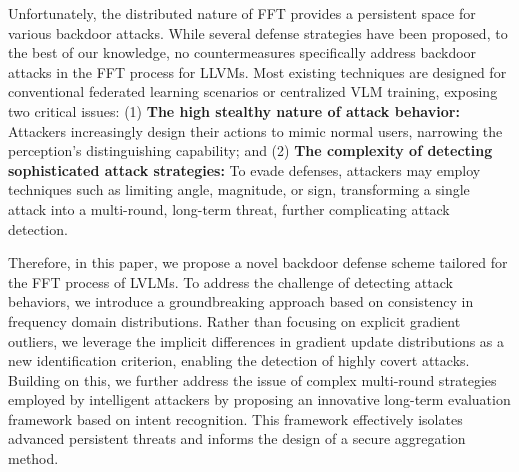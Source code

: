 \documentclass[lettersize,journal]{IEEEtran}
\begin{document}
Unfortunately, the distributed nature of FFT provides a persistent space for various backdoor attacks. While several defense strategies have been proposed, to the best of our knowledge, no countermeasures specifically address backdoor attacks in the FFT process for LLVMs. Most existing techniques are designed for conventional federated learning scenarios or centralized VLM training, exposing two critical issues: (1) \textbf{The high stealthy nature of attack behavior:} Attackers increasingly design their actions to mimic normal users, narrowing the perception’s distinguishing capability\cite{xu2024shadowcast, zhang2024a3fl}; and (2) \textbf{The complexity of detecting sophisticated attack strategies:} To evade defenses, attackers may employ techniques such as limiting angle, magnitude, or sign, transforming a single attack into a multi-round, long-term threat, further complicating attack detection\cite{geisler2024attacking, chen2024optimal, sagliano2024powered, dong2023adaptive,wan2023average}.

Therefore, in this paper, we propose a novel backdoor defense scheme tailored for the FFT process of LVLMs. To address the challenge of detecting attack behaviors, we introduce a groundbreaking approach based on consistency in frequency domain distributions. Rather than focusing on explicit gradient outliers, we leverage the implicit differences in gradient update distributions as a new identification criterion, enabling the detection of highly covert attacks. Building on this, we further address the issue of complex multi-round strategies employed by intelligent attackers by proposing an innovative long-term evaluation framework based on intent recognition. This framework effectively isolates advanced persistent threats and informs the design of a secure aggregation method.
\end{document}
